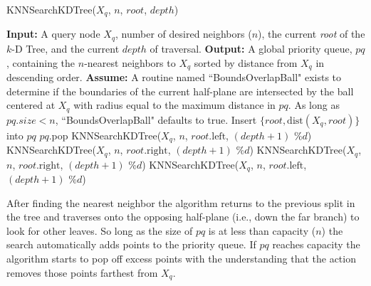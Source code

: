 \documentclass{report}
\begin{document}
\begin{algorithm} 
\caption{KNNSearchKDTree($X_q$, $n$, $root$, $depth$)}         \label{alg:kdtree_knn}  
\begin{algorithmic}[1]    
    \State \textbf{Input:} A query node $X_q$, number of desired neighbors ($n$), the current \emph{root} of the $k$-D Tree, and the current $depth$ of traversal.
    \State \textbf{Output:} A global priority queue, $pq$, containing the $n$-nearest neighbors to $X_q$ sorted by distance from $X_q$ in descending order.
    \State \textbf{Assume:} A routine named ``BoundsOverlapBall" exists to determine if the boundaries of the current half-plane are intersected by the ball centered at $X_q$ with radius equal to the maximum distance in $pq$. As long as $pq.size < n$, ``BoundsOverlapBall" defaults to true. %
    \State
        \State Insert $\{root,\text{dist}(X_q,root)\}$ into $pq$
            \State $pq$.pop 
        \EndIf
        \State \Return
    \EndIf
    \State
        \State KNNSearchKDTree($X_q$, $n$, $root.\text{left}$, $(depth+1) \text{ \% } d$)
    \Else
        \State KNNSearchKDTree($X_q$, $n$, $root.\text{right}$, $(depth+1) \text{ \% } d$)
    \EndIf
    \State 
            \State KNNSearchKDTree($X_q$, $n$, $root.\text{right}$, $(depth+1) \text{ \% } d$)
        \EndIf
    \Else
            \State KNNSearchKDTree($X_q$, $n$, $root.\text{left}$, $(depth+1) \text{ \% } d$)
        \EndIf
    \EndIf
    \State \Return
    \end{algorithmic}
\end{algorithm}

After finding the nearest neighbor the algorithm returns to the previous split in the tree and traverses onto the opposing half-plane (i.e., down the far branch) to look for other leaves. So long as the size of $pq$ is at less than capacity ($n$) the search automatically adds points to the priority queue. If $pq$ reaches capacity the algorithm starts to pop off excess points with the understanding that the action removes those points farthest from $X_q$. 
\end{document}
